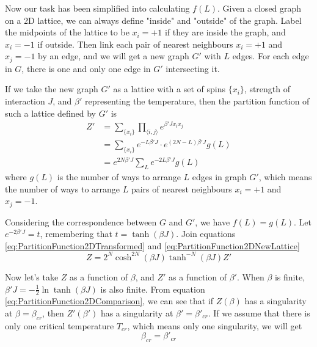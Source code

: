 \documentclass[11pt]{article}
\begin{document}
	Now our task has been simplified into calculating $f(L)$.
	Given a closed graph on a 2D lattice, we can always define "inside" and "outside" of the graph.
	Label the midpoints of the lattice to be $x_i=+1$ if they are inside the graph, and $x_i=-1$ if outside.
	Then link each pair of nearest neighbours $x_i=+1$ and $x_j=-1$ by an edge, 
	and we will get a new graph $G'$ with $L$ edges.
	For each edge in $G$, there is one and only one edge in $G'$ intersecting it.


	If we take the new graph $G'$ as a lattice with a set of spins $\{x_i\}$, 
	strength of interaction $J$, and $\beta'$ representing the temperature,
	then the partition function of such a lattice defined by $G'$ is
	\begin{equation} \label{eq:PartitionFunction2DNewLattice}
		\begin{aligned}
			Z' &= \sum_{\{x_i\}} \prod_{\langle i,j \rangle} e^{\beta' J x_i x_j} \\
			&= \sum_{\{x_i\}} e^{-L\beta' J} \cdot e^{(2N-L)\beta' J} g(L) \\
			&= e^{2N\beta' J} \sum_{L} e^{-2L\beta' J} g(L)
		\end{aligned}
	\end{equation}
	where $g(L)$ is the number of ways to arrange $L$ edges in graph $G'$, 
	which means the number of ways to arrange $L$ pairs of nearest neighbours $x_i=+1$ and $x_j=-1$.
	
	Considering the correspondence between $G$ and $G'$, we have $f(L) = g(L)$.
	Let $e^{-2\beta' J} = t$, remembering that $t = \tanh(\beta J)$.
	Join equations \eqref{eq:PartitionFunction2DTransformed} and \eqref{eq:PartitionFunction2DNewLattice}
	\begin{equation} \label{eq:PartitionFunction2DComparison}
		Z = 2^N \cosh^{2N}(\beta J) \tanh^{-N}(\beta J) Z'
	\end{equation}

	Now let's take $Z$ as a function of $\beta$, and $Z'$ as a function of $\beta'$.
	When $\beta$ is finite, $\beta' J = -\frac12 \ln{\tanh(\beta J)}$ is also finite.
	From equation \eqref{eq:PartitionFunction2DComparison}, we can see that 
	if $Z(\beta)$ has a singularity at $\beta = \beta_{cr}$, 
	then $Z'(\beta')$ has a singularity at $\beta' = \beta'_{cr}$.
	If we assume that there is only one critical temperature $T_{cr}$, 
	which means only one singularity, we will get
	\begin{equation} \label{eq:Singularity}
		\beta_{cr} = \beta'_{cr}
	\end{equation}
\end{document}
